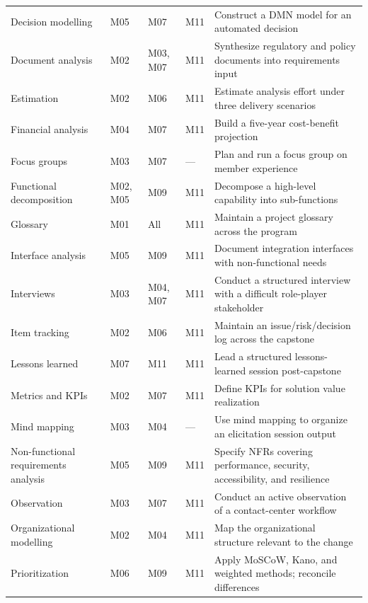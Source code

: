 \documentclass[11pt,letterpaper,oneside]{report}
\begin{document}
\begin{landscape}
\begin{longtable}{@{}R{4.45cm} R{2.10cm} R{2.55cm} R{1.55cm} R{8.40cm}@{}}
Decision modelling                 & M05 & M07 & M11 & Construct a DMN model for an automated decision \\
Document analysis                  & M02 & M03, M07 & M11 & Synthesize regulatory and policy documents into requirements input \\
Estimation                         & M02 & M06 & M11 & Estimate analysis effort under three delivery scenarios \\
Financial analysis                 & M04 & M07 & M11 & Build a five-year cost-benefit projection \\
Focus groups                       & M03 & M07 & ---  & Plan and run a focus group on member experience \\
Functional decomposition           & M02, M05 & M09 & M11 & Decompose a high-level capability into sub-functions \\
Glossary                           & M01 & All & M11 & Maintain a project glossary across the program \\
Interface analysis                 & M05 & M09 & M11 & Document integration interfaces with non-functional needs \\
Interviews                         & M03 & M04, M07 & M11 & Conduct a structured interview with a difficult role-player stakeholder \\
Item tracking                      & M02 & M06 & M11 & Maintain an issue/risk/decision log across the capstone \\
Lessons learned                    & M07 & M11 & M11 & Lead a structured lessons-learned session post-capstone \\
Metrics and KPIs                   & M02 & M07 & M11 & Define KPIs for solution value realization \\
Mind mapping                       & M03 & M04 & ---  & Use mind mapping to organize an elicitation session output \\
Non-functional requirements analysis & M05 & M09 & M11 & Specify NFRs covering performance, security, accessibility, and resilience \\
Observation                        & M03 & M07 & M11 & Conduct an active observation of a contact-center workflow \\
Organizational modelling           & M02 & M04 & M11 & Map the organizational structure relevant to the change \\
Prioritization                     & M06 & M09 & M11 & Apply MoSCoW, Kano, and weighted methods; reconcile differences \\

\end{longtable}
\end{landscape}
\end{document}
